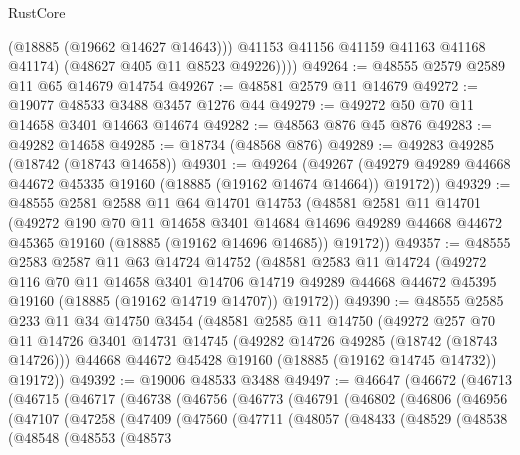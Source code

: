 \begin{lexlean}{RustCore}
\begin{coremodule}
              (@18885 (@19662 @14627 @14643)))
            @41153
            @41156
            @41159
            @41163
            @41168
            @41174)
          (@48627 @405 @11 @8523 @49226))))
@49264 := @48555 @2579 @2589 @11 @65 @14679 @14754
@49267 := @48581 @2579 @11 @14679
@49272 := @19077 @48533 @3488 @3457 @1276 @44
@49279 := @49272 @50 @70 @11 @14658 @3401 @14663 @14674
@49282 := @48563 @876 @45 @876
@49283 := @49282 @14658
@49285 := @18734 (@48568 @876)
@49289 := @49283 @49285 (@18742 (@18743 @14658))
@49301 := @49264
    (@49267 (@49279 @49289 @44668 @44672 @45335 @19160 (@18885 (@19162 @14674 @14664)) @19172))
@49329 := @48555
    @2581
    @2588
    @11
    @64
    @14701
    @14753
    (@48581
      @2581
      @11
      @14701
      (@49272
        @190
        @70
        @11
        @14658
        @3401
        @14684
        @14696
        @49289
        @44668
        @44672
        @45365
        @19160
        (@18885 (@19162 @14696 @14685))
        @19172))
@49357 := @48555
    @2583
    @2587
    @11
    @63
    @14724
    @14752
    (@48581
      @2583
      @11
      @14724
      (@49272
        @116
        @70
        @11
        @14658
        @3401
        @14706
        @14719
        @49289
        @44668
        @44672
        @45395
        @19160
        (@18885 (@19162 @14719 @14707))
        @19172))
@49390 := @48555
    @2585
    @233
    @11
    @34
    @14750
    @3454
    (@48581
      @2585
      @11
      @14750
      (@49272
        @257
        @70
        @11
        @14726
        @3401
        @14731
        @14745
        (@49282 @14726 @49285 (@18742 (@18743 @14726)))
        @44668
        @44672
        @45428
        @19160
        (@18885 (@19162 @14745 @14732))
        @19172))
@49392 := @19006 @48533 @3488
@49497 := @46647
    (@46672
      (@46713
        (@46715
          (@46717
            (@46738
              (@46756
                (@46773
                  (@46791
                    (@46802
                      (@46806
                        (@46956
                          (@47107
                            (@47258
                              (@47409
                                (@47560
                                  (@47711
                                    (@48057
                                      (@48433
                                        (@48529
                                          (@48538
                                            (@48548
                                              (@48553
                                                (@48573

\end{coremodule}
\end{lexlean}
